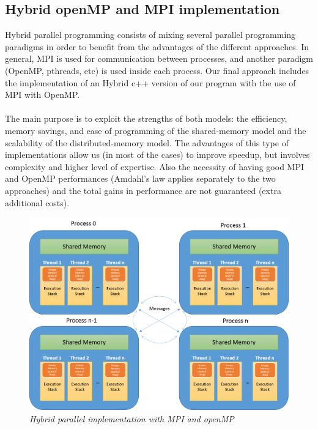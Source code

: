 \documentclass[12pt]{article}
\begin{document}
\subsection{Hybrid openMP and MPI implementation}

Hybrid parallel programming consists of mixing several parallel programming paradigms in order to benefit from the advantages of the different approaches. In general, MPI is used for communication between processes, and another paradigm (OpenMP, pthreads, etc) is used inside each process. Our final approach includes the implementation of an Hybrid c++ version of our program with the use of MPI with OpenMP.
\\\\
The main purpose is to exploit the strengths of both models: the efficiency, memory savings, and ease of programming of the shared-memory model and the scalability of the distributed-memory model. The advantages of this type of implementations allow us (in most of the cases) to improve speedup, but involves complexity and higher level of expertise. Also the necessity of having good MPI and OpenMP performances (Amdahl's law applies separately to the two approaches) and the total gains in performance are not guaranteed (extra additional costs)\cite{HybridP}.

	\begin{figure}[h!]
    \includegraphics[scale=0.6]{HybridArchitecture.png}
    \centering
    \caption{\textit{Hybrid parallel implementation with MPI and openMP}}
    \label{fig:hybridarch}
	\end{figure}
	
\end{document}
